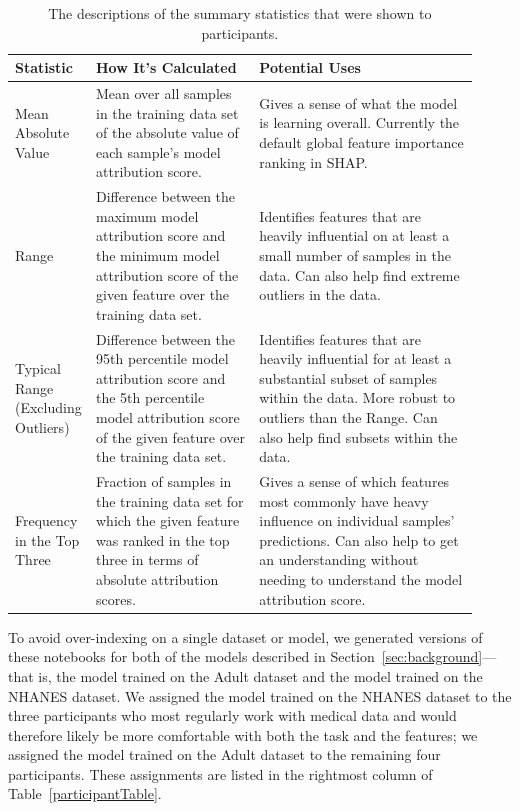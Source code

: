 \documentclass[11pt,dvipdfmx]{article}
\begin{document}
\begin{table}[t!]
  \caption{The descriptions of the summary statistics that were shown to participants.}
  \label{tab:descriptions}
  \begin{tabular}{p{0.1\linewidth} p{0.35\linewidth} p{0.47\linewidth}}
    \toprule
    \bf{Statistic} & \bf{How It's Calculated} & \bf{Potential Uses} \\
    \midrule
    Mean Absolute Value & Mean over all samples in the training data set of the absolute value of each sample's model attribution score. & Gives a sense of what the model is learning overall. Currently the default global feature importance ranking in SHAP. \\
\hline
    Range &  Difference between the maximum model attribution score and the minimum model attribution score of the given feature over the training data set. & Identifies features that are heavily influential on at least a small number of samples in the data. Can also help find extreme outliers in the data. \\
\hline
    Typical Range (Excluding Outliers) & Difference between the 95th percentile model attribution score and the 5th percentile model attribution score of the given feature over the training data set. & Identifies features that are heavily influential for at least a substantial subset of samples within the data. More robust to outliers than the Range. Can also help find subsets within the data. \\
\hline
    Frequency in the Top Three & Fraction of samples in the training data set for which the given feature was ranked in the top three in terms of absolute attribution scores.  & Gives a sense of which features most commonly have heavy influence on individual samples' predictions. Can also help to get an understanding without needing to understand the model attribution score. \\
    \bottomrule
  \end{tabular}
\end{table}

To avoid over-indexing on a single dataset or model, we generated
versions of these notebooks for both of the models described in
Section~\ref{sec:background}---that is, the model trained on the Adult
dataset and the model trained on the NHANES dataset.  We assigned the
model trained on the NHANES dataset to the three participants who most
regularly work with medical data and would therefore likely be more
comfortable with both the task and the features; we assigned the model
trained on the Adult dataset to the remaining four participants.
These assignments are listed in the rightmost column of
Table~\ref{participantTable}.
\end{document}
